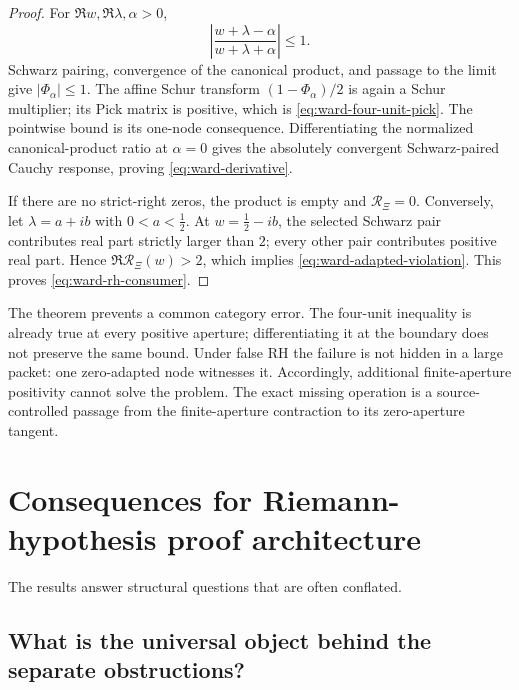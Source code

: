 \documentclass[11pt]{article}
\theoremstyle{definition}
\theoremstyle{remark}
\newcommand{\cR}{\mathcal R}
\begin{document}
\begin{proof}
For \(\Re w,\Re\lambda,\alpha>0\),
\[
 \left|\frac{w+\lambda-\alpha}{w+\lambda+\alpha}\right|\leq1.
\]
Schwarz pairing, convergence of the canonical product, and passage to the limit give
\(|\Phi_\alpha|\leq1\).  The affine Schur transform
\((1-\Phi_\alpha)/2\) is again a Schur multiplier; its Pick matrix is positive, which is
\eqref{eq:ward-four-unit-pick}.  The pointwise bound is its one-node consequence.
Differentiating the normalized canonical-product ratio at \(\alpha=0\) gives the absolutely
convergent Schwarz-paired Cauchy response, proving \eqref{eq:ward-derivative}.

If there are no strict-right zeros, the product is empty and
\(\cR_\Xi=0\).  Conversely, let \(\lambda=a+ib\) with \(0<a<\tfrac12\).  At
\(w=\tfrac12-ib\), the selected Schwarz pair contributes real part
strictly larger than \(2\); every other pair contributes positive real part.  Hence
\(\Re\cR_\Xi(w)>2\), which implies \eqref{eq:ward-adapted-violation}.  This proves
\eqref{eq:ward-rh-consumer}.
\end{proof}

The theorem prevents a common category error.  The four-unit inequality is already true at every
positive aperture; differentiating it at the boundary does not preserve the same bound.  Under
false RH the failure is not hidden in a large packet: one zero-adapted node witnesses it.
Accordingly, additional finite-aperture positivity cannot solve the problem.  The exact missing
operation is a source-controlled passage from the finite-aperture contraction to its
zero-aperture tangent.

\section{Consequences for Riemann-hypothesis proof architecture}\label{sec:rh}

The results answer structural questions that are often conflated.

\subsection{What is the universal object behind the separate obstructions?}
\end{document}
